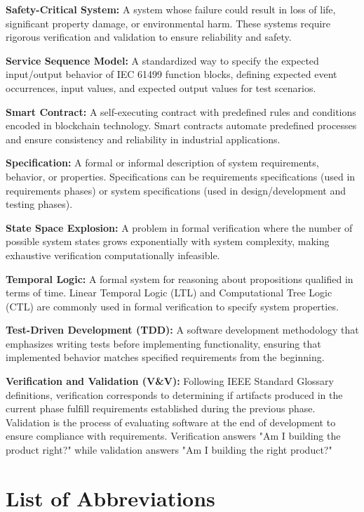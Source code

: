 \textbf{Safety-Critical System:} A system whose failure could result in loss of life, significant property damage, or environmental harm. These systems require rigorous verification and validation to ensure reliability and safety.

\textbf{Service Sequence Model:} A standardized way to specify the expected input/output behavior of IEC 61499 function blocks, defining expected event occurrences, input values, and expected output values for test scenarios.

\textbf{Smart Contract:} A self-executing contract with predefined rules and conditions encoded in blockchain technology. Smart contracts automate predefined processes and ensure consistency and reliability in industrial applications.

\textbf{Specification:} A formal or informal description of system requirements, behavior, or properties. Specifications can be requirements specifications (used in requirements phases) or system specifications (used in design/development and testing phases).

\textbf{State Space Explosion:} A problem in formal verification where the number of possible system states grows exponentially with system complexity, making exhaustive verification computationally infeasible.

\textbf{Temporal Logic:} A formal system for reasoning about propositions qualified in terms of time. Linear Temporal Logic (LTL) and Computational Tree Logic (CTL) are commonly used in formal verification to specify system properties.

\textbf{Test-Driven Development (TDD):} A software development methodology that emphasizes writing tests before implementing functionality, ensuring that implemented behavior matches specified requirements from the beginning.

\textbf{Verification and Validation (V\&V):} Following IEEE Standard Glossary definitions, verification corresponds to determining if artifacts produced in the current phase fulfill requirements established during the previous phase. Validation is the process of evaluating software at the end of development to ensure compliance with requirements. Verification answers "Am I building the product right?" while validation answers "Am I building the right product?"

\section{List of Abbreviations}

